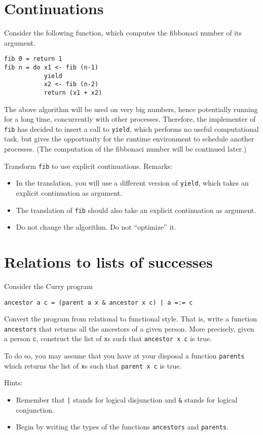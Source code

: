 \documentclass{article}
\begin{document}
\section{Continuations}

Consider the following function, which computes the fibbonaci number
of its argument.
\begin{verbatim}
fib 0 = return 1
fib n = do x1 <- fib (n-1)
           yield
           x2 <- fib (n-2)
           return (x1 + x2)
\end{verbatim}

The above algorithm will be used on very big numbers, hence
potentially running for a long time, concurrently with other
processes. Therefore, the implementer of \texttt{fib} has decided to
insert a call to \texttt{yield}, which performs no useful
computational task, but gives the opportunity for the runtime
environment to schedule another processes. (The computation of the
fibbonaci number will be continued later.)

Transform \texttt{fib} to use explicit continuations. Remarks: 
\begin{itemize}
\item In the translation, you will use a different version of
  \texttt{yield}, which takes an explicit continuation as argument.
\item The translation of \texttt{fib} should also take an explicit
  continuation as argument.
\item Do not change the algorithm. Do not ``optimize'' it.
\end{itemize}

\newpage
\section{Relations to lists of successes}

Consider the Curry program
\begin{verbatim}
ancestor a c = (parent a x & ancestor x c) | a =:= c
\end{verbatim}



Convert the program from relational to functional style. That is,
write a function \texttt{ancestors} that returns all the ancestors of
a given person.  More precisely, given a person \texttt{c}, construct the
list of \texttt{x}s such that \texttt{ancestor x c} is true.

To do so, you may assume that you have at your disposal a function
\texttt{parents} which returns the list of \texttt{x}s such that
\texttt{parent x c} is true.

Hints: 
\begin{itemize}
\item Remember that \texttt{|} stands for logical disjunction and
  \texttt{\&} stands for logical conjunction.
\item Begin by writing the types of the functions \texttt{ancestors}
  and \texttt{parents}.
\end{itemize}
\end{document}
